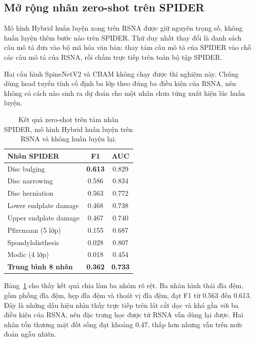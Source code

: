 \subsection{Mở rộng nhãn zero-shot trên SPIDER}
\label{subsec:spider_zeroshot}

Mô hình Hybrid huấn luyện xong trên RSNA được giữ nguyên trọng số, không huấn luyện thêm bước nào trên SPIDER. Thứ duy nhất thay đổi là danh sách câu mô tả đưa vào bộ mã hóa văn bản: thay tám câu mô tả của SPIDER vào chỗ các câu mô tả của RSNA, rồi chấm trực tiếp trên toàn bộ tập SPIDER.

Hai cấu hình SpineNetV2 và CBAM không chạy được thí nghiệm này. Chúng dùng head tuyến tính cố định ba lớp theo đúng ba điều kiện của RSNA, nên không có cách nào sinh ra dự đoán cho một nhãn chưa từng xuất hiện lúc huấn luyện.

\begin{table}[htbp]
\centering
\caption{Kết quả zero-shot trên tám nhãn SPIDER, mô hình Hybrid huấn luyện trên RSNA và không huấn luyện lại.}
\label{tab:spider_zeroshot}
\renewcommand{\arraystretch}{1.2}
\begin{tabular}{lcc}
\toprule
\textbf{Nhãn SPIDER} & \textbf{F1} & \textbf{AUC} \\
\midrule
Disc bulging          & \textbf{0.613} & 0.829 \\
Disc narrowing        & 0.586 & 0.834 \\
Disc herniation       & 0.563 & 0.772 \\
\midrule
Lower endplate damage & 0.468 & 0.738 \\
Upper endplate damage & 0.467 & 0.740 \\
Pfirrmann (5 lớp)     & 0.155 & 0.687 \\
Spondylolisthesis     & 0.028 & 0.807 \\
Modic (4 lớp)         & 0.018 & 0.454 \\
\midrule
\textbf{Trung bình 8 nhãn} & \textbf{0.362} & \textbf{0.733} \\
\bottomrule
\end{tabular}
\end{table}

Bảng~\ref{tab:spider_zeroshot} cho thấy kết quả chia làm ba nhóm rõ rệt. Ba nhãn hình thái đĩa đệm, gồm phồng đĩa đệm, hẹp đĩa đệm và thoát vị đĩa đệm, đạt F1 từ 0.563 đến 0.613. Đây là những dấu hiệu nhìn thấy trực tiếp trên lát cắt dọc và khá gần với ba điều kiện của RSNA, nên đặc trưng học được từ RSNA vẫn dùng lại được. Hai nhãn tổn thương mặt đốt sống đạt khoảng 0.47, thấp hơn nhưng vẫn trên mức đoán ngẫu nhiên.

